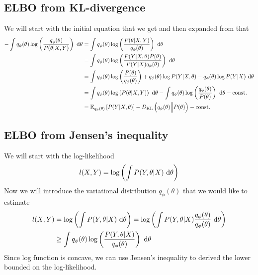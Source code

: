 \subsection{ELBO from KL-divergence}
\label{appx:chap2-elbo-kl}
We will start with the initial equation that we get and then expanded from that 
\begin{equation*}
    \begin{aligned}
        -\int q_{\phi} (\theta) \log\left( \frac{q_{\phi} (\theta)}{P(\theta | X, Y)} \right) \ \mathrm{d} \theta &= \int q_{\phi} (\theta) \log\left( \frac{P(\theta | X, Y)}{q_{\phi} (\theta)} \right) \ \mathrm{d} \theta \\ 
        &= \int q_{\phi} (\theta) \log\left( \frac{P(Y | X, \theta) P(\theta)}{P(Y|X)q_{\phi} (\theta)} \right) \ \mathrm{d} \theta \\
        &= \int q_{\phi} (\theta) \log \left( \frac{P(\theta)}{q_{\phi} (\theta)} \right) + q_{\phi} (\theta) \log P(Y | X, \theta) - q_{\phi} (\theta) \log P(Y| X) \ \mathrm{d} \theta \\
        &= \int q_{\phi} (\theta) \log\left( P(\theta | X, Y) \right) \ \mathrm{d} \theta - \int q_{\phi} (\theta) \log\left( \frac{q_{\phi} (\theta)}{P(\theta)} \right) \ \mathrm{d} \theta  - \text{const.} \\
        &= \mathbb{E}_{q_{\phi} (\theta)} \left[ P(Y | X, \theta) \right] - D_{\mathrm{KL}} \left(q_{\phi} (\theta) \Big\| P(\theta) \right) - \text{const.} \\
    \end{aligned}
\end{equation*}


\subsection{ELBO from Jensen's inequality}
\label{appx:chap2-elbo-jensen}
We will start with the log-likelihood 
\begin{equation}
    l(X, Y) = \log \left( \int P(Y,  \theta | X) \ \mathrm{d} \theta \right)
\end{equation}
Now we will introduce the variational distribution $q_{\phi}(\theta)$ that we would like to estimate
\begin{equation*}
    \begin{aligned}
        l(X, Y) &= \log \left( \int P(Y,  \theta | X) \ \mathrm{d} \theta \right) = \log \left( \int P(Y,  \theta | X) \frac{q_{\phi}(\theta)}{q_{\phi}(\theta)} \ \mathrm{d} \theta \right) \\
        &\ge \int  q_{\phi}(\theta) \log\left(\frac{P(Y,  \theta | X)}{q_{\phi}(\theta)}\right) \ \mathrm{d} \theta
    \end{aligned}
\end{equation*}
Since log function is concave, we can use Jensen's inequality to derived the lower bounded on the log-likelihood.


